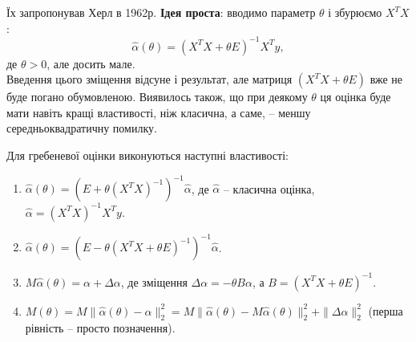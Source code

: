 Їх запропонував Херл в 1962р. \textbf{Ідея проста}: вводимо параметр $\theta$ і збурюємо $X^TX$:
\[ \widehat{\alpha}(\theta)=(X^TX+\theta E)^{-1}X^Ty,\] де $\theta > 0$, але досить мале.\\

Введення цього зміщення відсуне і результат, але матриця $(X^TX+\theta E)$ вже не буде погано обумовленою. Виявилось також, що при деякому $\theta$ ця оцінка буде мати навіть кращі властивості, ніж класична, а саме, -- меншу середньоквадратичну помилку.

\begin{theorem}
	Для гребеневої оцінки виконуються наступні властивості:
	\begin{enumerate}
		\item $\widehat{\alpha}(\theta) = (E+\theta(X^TX)^{-1})^{-1}\widehat{\alpha}$, де $\widehat{\alpha}$ -- класична оцінка, $\widehat{\alpha}=(X^TX)^{-1}X^Ty$.
		
		\item $\widehat{\alpha}(\theta) = (E-\theta(X^TX+\theta E)^{-1})^{-1}\widehat{\alpha}$.
		
		\item $M\widehat{\alpha}(\theta)=\alpha+\Delta\alpha$, де зміщення $\Delta\alpha=-\theta B\alpha$, а $B=(X^TX+\theta E)^{-1}$.

		\item $M(\theta) = M\|\widehat{\alpha}(\theta)-\alpha\|_2^2 = M \|\widehat{\alpha}(\theta)-M\widehat{\alpha}(\theta)\|_2^2 + \|\Delta\alpha\|_2^2$ (перша рівність -- просто позначення).
	\end{enumerate}
\end{theorem}




